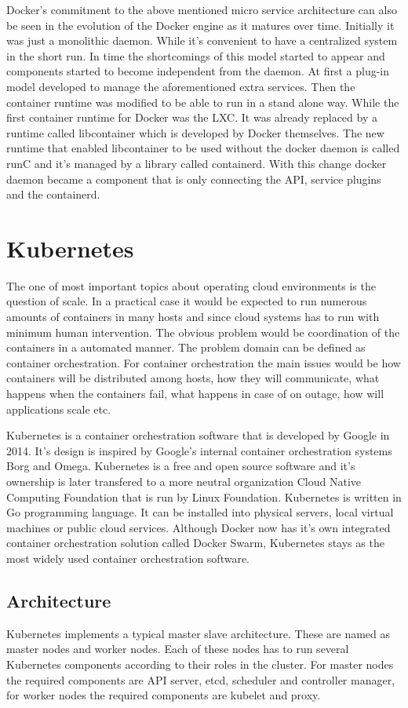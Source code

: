 \documentclass[12pt,oneandhalf,chaparabic,ceng,ms,eng,oneside,pntc]{gsufbe}
\begin{document}
Docker's commitment to the above mentioned micro service architecture can also be seen in the evolution
of the Docker engine as it matures over time. Initially it was just a monolithic daemon. While it's
convenient to have a centralized system in the short run. In time the shortcomings of this model
started to appear and components started to become independent from the daemon. At first a plug-in
model developed to manage the aforementioned extra services. Then the container runtime was modified to
be able to run in a stand alone way. While the first container runtime for Docker was the LXC. It was
already replaced by a runtime called libcontainer which is developed by Docker themselves. The new
runtime that enabled libcontainer to be used without the docker daemon is called runC and it's managed
by a library called containerd. With this change docker daemon became a component that is only
connecting the API, service plugins and the containerd.

\section{Kubernetes}
The one of most important topics about operating cloud environments is the question of scale. In a
practical case it would be expected to run numerous amounts of containers in many hosts and since
cloud systems has to run with minimum human intervention. The obvious problem would be coordination
of the containers in a automated manner. The problem domain can be defined as container orchestration.
For container orchestration the main issues would be how containers will be distributed among hosts,
how they will communicate, what happens when the containers fail, what happens in case of on outage,
how will applications scale etc.

Kubernetes is a container orchestration software that is developed by Google in 2014. It's design is
inspired by Google's internal container orchestration systems Borg and Omega. Kubernetes is a free and
open source software and it's ownership is later transfered to a more neutral organization Cloud Native
Computing Foundation that is run by Linux Foundation. Kubernetes is written in Go programming language.
It can be installed into physical servers, local virtual machines or public cloud services. Although
Docker now has it's own integrated container orchestration solution called Docker Swarm, Kubernetes
stays as the most widely used container orchestration software.

\subsection{Architecture}
Kubernetes implements a typical master slave architecture. These are named as master nodes and worker
nodes. Each of these nodes has to run several Kubernetes components according to their roles in the
cluster. For master nodes the required components are API server, etcd, scheduler and
controller manager, for worker nodes the required components are kubelet and proxy.
\end{document}
